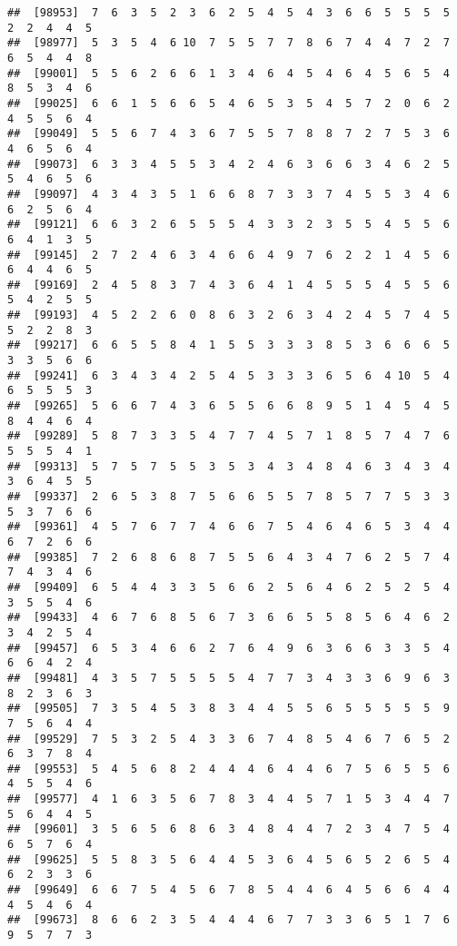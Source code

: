 \documentclass[
]{book}
\begin{document}
\begin{verbatim}
##  [98953]  7  6  3  5  2  3  6  2  5  4  5  4  3  6  6  5  5  5  5  2  2  4  4  5
##  [98977]  5  3  5  4  6 10  7  5  5  7  7  8  6  7  4  4  7  2  7  6  5  4  4  8
##  [99001]  5  5  6  2  6  6  1  3  4  6  4  5  4  6  4  5  6  5  4  8  5  3  4  6
##  [99025]  6  6  1  5  6  6  5  4  6  5  3  5  4  5  7  2  0  6  2  4  5  5  6  4
##  [99049]  5  5  6  7  4  3  6  7  5  5  7  8  8  7  2  7  5  3  6  4  6  5  6  4
##  [99073]  6  3  3  4  5  5  3  4  2  4  6  3  6  6  3  4  6  2  5  5  4  6  5  6
##  [99097]  4  3  4  3  5  1  6  6  8  7  3  3  7  4  5  5  3  4  6  6  2  5  6  4
##  [99121]  6  6  3  2  6  5  5  5  4  3  3  2  3  5  5  4  5  5  6  6  4  1  3  5
##  [99145]  2  7  2  4  6  3  4  6  6  4  9  7  6  2  2  1  4  5  6  6  4  4  6  5
##  [99169]  2  4  5  8  3  7  4  3  6  4  1  4  5  5  5  4  5  5  6  5  4  2  5  5
##  [99193]  4  5  2  2  6  0  8  6  3  2  6  3  4  2  4  5  7  4  5  5  2  2  8  3
##  [99217]  6  6  5  5  8  4  1  5  5  3  3  3  8  5  3  6  6  6  5  3  3  5  6  6
##  [99241]  6  3  4  3  4  2  5  4  5  3  3  3  6  5  6  4 10  5  4  6  5  5  5  3
##  [99265]  5  6  6  7  4  3  6  5  5  6  6  8  9  5  1  4  5  4  5  8  4  4  6  4
##  [99289]  5  8  7  3  3  5  4  7  7  4  5  7  1  8  5  7  4  7  6  5  5  5  4  1
##  [99313]  5  7  5  7  5  5  3  5  3  4  3  4  8  4  6  3  4  3  4  3  6  4  5  5
##  [99337]  2  6  5  3  8  7  5  6  6  5  5  7  8  5  7  7  5  3  3  5  3  7  6  6
##  [99361]  4  5  7  6  7  7  4  6  6  7  5  4  6  4  6  5  3  4  4  6  7  2  6  6
##  [99385]  7  2  6  8  6  8  7  5  5  6  4  3  4  7  6  2  5  7  4  7  4  3  4  6
##  [99409]  6  5  4  4  3  3  5  6  6  2  5  6  4  6  2  5  2  5  4  3  5  5  4  6
##  [99433]  4  6  7  6  8  5  6  7  3  6  6  5  5  8  5  6  4  6  2  3  4  2  5  4
##  [99457]  6  5  3  4  6  6  2  7  6  4  9  6  3  6  6  3  3  5  4  6  6  4  2  4
##  [99481]  4  3  5  7  5  5  5  5  4  7  7  3  4  3  3  6  9  6  3  8  2  3  6  3
##  [99505]  7  3  5  4  5  3  8  3  4  4  5  5  6  5  5  5  5  5  9  7  5  6  4  4
##  [99529]  7  5  3  2  5  4  3  3  6  7  4  8  5  4  6  7  6  5  2  6  3  7  8  4
##  [99553]  5  4  5  6  8  2  4  4  4  6  4  4  6  7  5  6  5  5  6  4  5  5  4  6
##  [99577]  4  1  6  3  5  6  7  8  3  4  4  5  7  1  5  3  4  4  7  5  6  4  4  5
##  [99601]  3  5  6  5  6  8  6  3  4  8  4  4  7  2  3  4  7  5  4  6  5  7  6  4
##  [99625]  5  5  8  3  5  6  4  4  5  3  6  4  5  6  5  2  6  5  4  6  2  3  3  6
##  [99649]  6  6  7  5  4  5  6  7  8  5  4  4  6  4  5  6  6  4  4  4  5  4  6  4
##  [99673]  8  6  6  2  3  5  4  4  4  6  7  7  3  3  6  5  1  7  6  9  5  7  7  3

\end{verbatim}
\end{document}
